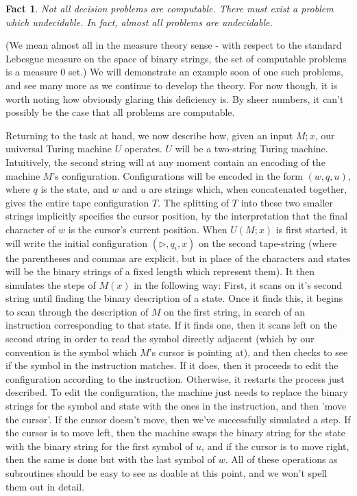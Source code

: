 \documentclass{article}
\theoremstyle{definition}
\theoremstyle{plain}
\theoremstyle{theorem}
\newtheorem{fact}{Fact}[section]
\begin{document}
\begin{fact}
	Not all decision problems are computable. There must exist a problem which \textit{undecidable}. In fact, \textit{almost all} problems are undecidable. 
\end{fact}
(We mean almost all in the measure theory sense - with respect to the standard Lebesgue measure on the space of binary strings, the set of computable problems is a measure $0$ set.) We will demonstrate an example soon of one such problems, and see many more as we continue to develop the theory. For now though, it is worth noting how obviously glaring this deficiency is. By sheer numbers, it can't possibly be the case that all problems are computable. \par 
Returning to the task at hand, we now describe how, given an input $M;x$, our universal Turing machine $U$ operates. $U$ will be a two-string Turing machine. Intuitively, the second string will at any moment contain an encoding of the machine $M$'s configuration. Configurations will be encoded in the form $(w,q,u)$, where $q$ is the state, and $w$ and $u$ are strings which, when concatenated together, gives the entire tape configuration $T$. The splitting of $T$ into these two smaller strings implicitly specifies the cursor position, by the interpretation that the final character of $w$ is the cursor's current position. When $U(M;x)$ is first started, it will write the initial configuration $(\triangleright,q_i,x)$ on the second tape-string (where the parentheses and commas are explicit, but in place of the characters and states will be the binary strings of a fixed length which represent them). It then simulates the steps of $M(x)$ in the following way: First, it scans on it's second string until finding the binary description of a state. Once it finds this, it begins to scan through the description of $M$ on the first string, in search of an instruction corresponding to that state. If it finds one, then it scans left on the second string in order to read the symbol directly adjacent (which by our convention is the symbol which $M$'s cursor is pointing at), and then checks to see if the symbol in the instruction matches. If it does, then it proceeds to edit the configuration according to the instruction. Otherwise, it restarts the process just described. To edit the configuration, the machine just needs to replace the binary strings for the symbol and state with the ones in the instruction, and then 'move the cursor'. If the cursor doesn't move, then we've successfully simulated a step. If the cursor is to move left, then the machine swaps the binary string for the state with the binary string for the first symbol of $u$, and if the cursor is to move right, then the same is done but with the last symbol of $w$. All of these operations as subroutines should be easy to see as doable at this point, and we won't spell them out in detail. \par 
\end{document}

